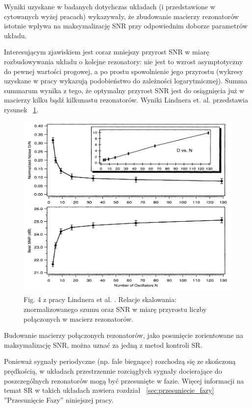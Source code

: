   Wyniki uzyskane w badanych dotychczas układach (i przedstawione w cytowanych wyżej pracach) wykazywały, że zbudowanie macierzy rezonatorów istotnie wpływa na maksymalizację SNR przy odpowiednim doborze parametrów układu.


  Interesującym zjawiskiem jest coraz mniejszy przyrost SNR w miarę rozbudowywania układu o kolejne rezonatory: nie jest to wzrost asymptotyczny do pewnej wartości progowej, a po prostu spowolnienie jego przyrostu (wykresy uzyskane w pracy \cite{lindner_meadows} wykazują podobieństwo do zależności logarytmicznej). Summa summarum wynika z tego, że optymalny przyrost SNR jest do osiągnięcia już w macierzy kilku bądź kilkunastu rezonatorów. Wyniki Lindnera et. al. przedstawia rysunek ~\ref{fig:graphics:lindner_meadows}.

  \begin{figure}
    \includegraphics[width=120mm]{images/lindner_meadows.png}
    \caption{Fig. 4 z pracy Lindnera et al. \cite{lindner_meadows}. Relacje skalowania: znormalizowanego szumu oraz SNR w miarę przyrostu liczby połączonych w macierz rezonatorów.}
    \label{fig:graphics:lindner_meadows}
  \end{figure}

  Budowanie macierzy połączonych rezonatorów, jako posunięcie zorientowane na maksymalizację SNR, można uznać za jedną z metod kontroli SR.

  Ponieważ sygnały periodyczne (np. fale biegnące) rozchodzą się ze skończoną prędkością, w układach przestrzennie rozciągłych sygnały docierające do poszczególnych rezonatorów mogą być przesunięte w fazie. Więcej informacji na temat SR w takich układach zawiera rozdział ~\ref{sec:przesuniecie_fazy} ''Przesunięcie Fazy'' niniejszej pracy.

